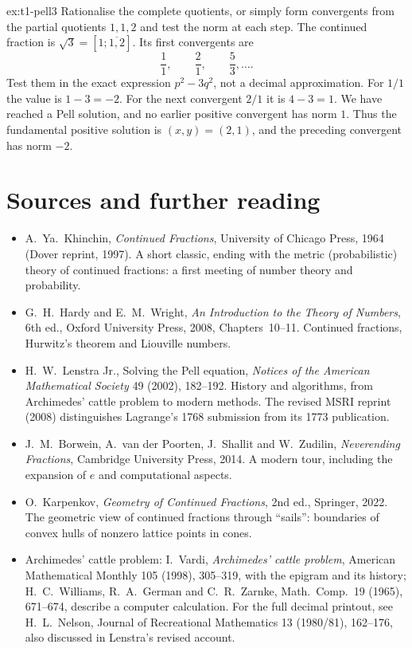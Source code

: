 \begin{solution}{ex:t1-pell3}
\idea Rationalise the complete quotients, or simply form convergents from the partial quotients $1,1,2$ and test the norm at each step.
\writeup The continued fraction is $\sqrt3=[1;\overline{1,2}]$. Its first convergents are
\[
\frac11,\qquad\frac21,\qquad\frac53,\ldots.
\]
Test them in the exact expression $p^2-3q^2$, not a decimal approximation. For $1/1$ the value is $1-3=-2$. For the next convergent $2/1$ it is $4-3=1$. We have reached a Pell solution, and no earlier positive convergent has norm $1$. Thus the fundamental positive solution is $(x,y)=(2,1)$, and the preceding convergent has norm $-2$.
\end{solution}

\section*{Sources and further reading}

\begin{itemize}
\item A.~Ya.~Khinchin, \emph{Continued Fractions}, University of Chicago Press, 1964 (Dover reprint, 1997). A short classic, ending with the metric (probabilistic) theory of continued fractions: a first meeting of number theory and probability.
\item G.~H.~Hardy and E.~M.~Wright, \emph{An Introduction to the Theory of Numbers}, 6th ed., Oxford University Press, 2008, Chapters~10--11. Continued fractions, Hurwitz's theorem and Liouville numbers.
\item H.~W.~Lenstra Jr., Solving the Pell equation, \emph{Notices of the American Mathematical Society} 49 (2002), 182--192. History and algorithms, from Archimedes' cattle problem to modern methods. The revised MSRI reprint (2008) distinguishes Lagrange's 1768 submission from its 1773 publication.
\item J.~M.~Borwein, A.~van der Poorten, J.~Shallit and W.~Zudilin, \emph{Neverending Fractions}, Cambridge University Press, 2014. A modern tour, including the expansion of $e$ and computational aspects.
\item O.~Karpenkov, \emph{Geometry of Continued Fractions}, 2nd ed., Springer, 2022. The geometric view of continued fractions through ``sails'': boundaries of convex hulls of nonzero lattice points in cones.
\item Archimedes' cattle problem: I.~Vardi, \emph{Archimedes' cattle problem}, American Mathematical Monthly 105 (1998), 305--319, with the epigram and its history; H.~C.~Williams, R.~A.~German and C.~R.~Zarnke, Math.\ Comp.\ 19 (1965), 671--674, describe a computer calculation. For the full decimal printout, see H.~L.~Nelson, Journal of Recreational Mathematics 13 (1980/81), 162--176, also discussed in Lenstra's revised account.
\end{itemize}
